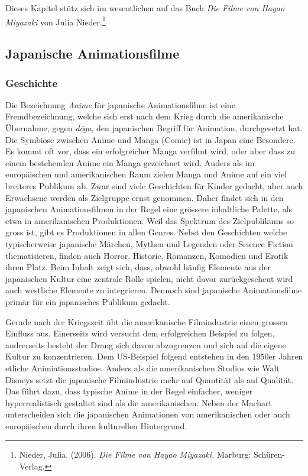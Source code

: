 Dieses Kapitel stütz sich im wesentlichen auf das Buch \emph{Die Filme von Hayao Miyazaki} von Julia Nieder.\footnote{Nieder, Julia.	(2006). \emph{Die Filme von Hayao Miyazaki.}	Marburg: Schüren-Verlag.}

\subsection{Japanische Animationsfilme}
\subsubsection{Geschichte}
Die Bezeichnung \emph{Anime} für japanische Animationsfilme ist eine Fremdbezeichnung, welche sich erst nach dem Krieg durch die amerikanische Übernahme, gegen \emph{d\={o}ga}, den japanischen Begriff für Animation, durchgesetzt hat. Die Symbiose zwischen Anime und Manga (Comic) ist in Japan eine Besondere. Es kommt oft vor, dass ein erfolgreicher Manga verfilmt wird, oder aber dass zu einem bestehenden Anime ein Manga gezeichnet wird. 
Anders als im europäischen und amerikanischen Raum zielen Manga und Anime auf ein viel breiteres Publikum ab. Zwar sind viele Geschichten für Kinder gedacht, aber auch Erwachsene werden als Zielgruppe ernst genommen. Daher findet sich in den japanischen Animationsfilmen in der Regel eine grössere inhaltliche Palette, als etwa in amerikanischen Produktionen. Weil das Spektrum des Zielpublikums so gross ist, gibt es Produktionen in allen Genres. Nebst den Geschichten welche typischerweise japanische Märchen, Mythen und Legenden oder Science Fiction thematisieren, finden auch Horror, Historie, Romanzen, Komödien und Erotik ihren Platz. Beim Inhalt zeigt sich, dass, obwohl häufig Elemente aus der japanischen Kultur eine zentrale Rolle spielen, nicht davor zurückgescheut wird auch westliche Elemente zu integrieren. Dennoch sind japanische Animationsfilme primär für ein japanisches Publikum gedacht. 

Gerade nach der Kriegszeit übt die amerikanische Filmindustrie einen grossen Einfluss aus. Einerseits wird versucht dem erfolgreichen Beispiel zu folgen, andrerseits besteht der Drang sich davon abzugrenzen und sich auf die eigene Kultur zu konzentrieren. Dem US-Beispiel folgend entstehen in den 1950er Jahren etliche Animiationsstudios. Anders als die amerikanischen Studios wie Walt Disneys setzt die japanische Filmindustrie mehr auf Quantität als auf Qualität. Das führt dazu, dass typische Anime in der Regel einfacher, weniger hyperrealistisch gestaltet sind als die amerikanischen. Neben der Machart unterscheiden sich die japanischen Animationen von amerikanischen oder auch europäischen durch ihren kulturellen Hintergrund. 

